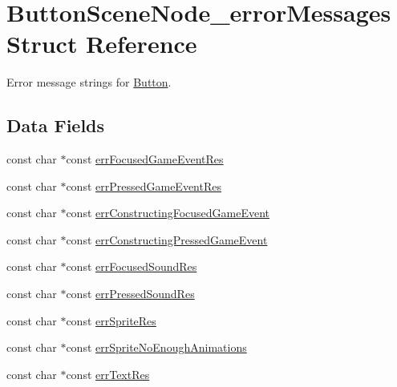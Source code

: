 \hypertarget{struct_button_scene_node__error_messages}{}\section{Button\+Scene\+Node\+\_\+error\+Messages Struct Reference}
\label{struct_button_scene_node__error_messages}


Error message strings for \hyperlink{struct_button}{Button}.  


\subsection*{Data Fields}
\begin{DoxyCompactItemize}
\item 
const char $\ast$const \hyperlink{struct_button_scene_node__error_messages_aff52e1524b98973729b8be6b9cb58421}{err\+Focused\+Game\+Event\+Res}
\item 
const char $\ast$const \hyperlink{struct_button_scene_node__error_messages_a5e537d6f2d8a4cf81f571513054f10cf}{err\+Pressed\+Game\+Event\+Res}
\item 
const char $\ast$const \hyperlink{struct_button_scene_node__error_messages_aa0aa63c6316692a9d676e9993a64a892}{err\+Constructing\+Focused\+Game\+Event}
\item 
const char $\ast$const \hyperlink{struct_button_scene_node__error_messages_ac4bb16972806698fabe7f2a720f09657}{err\+Constructing\+Pressed\+Game\+Event}
\item 
const char $\ast$const \hyperlink{struct_button_scene_node__error_messages_a329745e9fc968ed59f192c8733177c58}{err\+Focused\+Sound\+Res}
\item 
const char $\ast$const \hyperlink{struct_button_scene_node__error_messages_a72cbf55f4a97dc32dce79f4fd846e61b}{err\+Pressed\+Sound\+Res}
\item 
const char $\ast$const \hyperlink{struct_button_scene_node__error_messages_ad6133b178aff7e77482cdc3919ce7a09}{err\+Sprite\+Res}
\item 
const char $\ast$const \hyperlink{struct_button_scene_node__error_messages_a0b780715927c1774033283fc5f1e60db}{err\+Sprite\+No\+Enough\+Animations}
\item 
const char $\ast$const \hyperlink{struct_button_scene_node__error_messages_a4039af7d7af66f85b0dd8d17b4549ea8}{err\+Text\+Res}
\end{DoxyCompactItemize}


